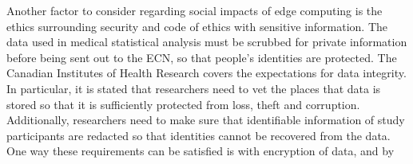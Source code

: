 \documentclass[../mthe-493-final-project.tex]{subfiles}
\begin{document}
    Another factor to consider regarding social impacts of edge computing is the ethics surrounding security and code of ethics with sensitive information. The data used in medical statistical analysis must be scrubbed for private information before being sent out to the ECN, so that people's identities are protected. The Canadian Institutes of Health Research covers the expectations for data integrity. In particular, it is stated that researchers need to vet the places that data is stored so that it is sufficiently protected from loss, theft and corruption. Additionally, researchers need to make sure that identifiable information of study participants are redacted so that identities cannot be recovered from the data. One way these requirements can be satisfied is with encryption of data, and by 
    
\end{document}
